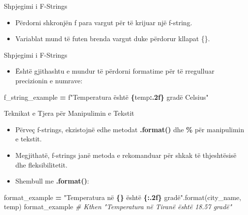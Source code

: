 \documentclass[
  ignorenonframetext,
]{beamer}
\newenvironment{Shaded}{\begin{snugshade}}{\end{snugshade}}
\newcommand{\BuiltInTok}[1]{#1}
\newcommand{\CommentTok}[1]{\textcolor[rgb]{0.56,0.35,0.01}{\textit{#1}}}
\newcommand{\NormalTok}[1]{#1}
\newcommand{\OperatorTok}[1]{\textcolor[rgb]{0.81,0.36,0.00}{\textbf{#1}}}
\newcommand{\SpecialCharTok}[1]{\textcolor[rgb]{0.81,0.36,0.00}{\textbf{#1}}}
\newcommand{\SpecialStringTok}[1]{\textcolor[rgb]{0.31,0.60,0.02}{#1}}
\newcommand{\StringTok}[1]{\textcolor[rgb]{0.31,0.60,0.02}{#1}}
\providecommand{\tightlist}{%
  \setlength{\itemsep}{0pt}\setlength{\parskip}{0pt}}
\begin{document}
\begin{frame}{Shpjegimi i F-Strings}
\protect\hypertarget{shpjegimi-i-f-strings}{}
\begin{itemize}
\item
  Përdorni shkronjën f para vargut për të krijuar një f-string.
\item
  Variablat mund të futen brenda vargut duke përdorur kllapat \{\}.
\end{itemize}
\end{frame}

\begin{frame}[fragile]{Shpjegimi i F-Strings}
\protect\hypertarget{shpjegimi-i-f-strings-1}{}
\begin{itemize}
\tightlist
\item
  Është gjithashtu e mundur të përdorni formatime për të rregulluar
  precizionin e numrave:
\end{itemize}

\begin{Shaded}
\begin{Highlighting}[]
\NormalTok{f\_string\_example }\OperatorTok{=} \SpecialStringTok{f"Temperatura është }\SpecialCharTok{\{}\NormalTok{temp}\SpecialCharTok{:.2f\}}\SpecialStringTok{ gradë Celsius"}
\end{Highlighting}
\end{Shaded}
\end{frame}

\begin{frame}[fragile]{Teknikat e Tjera për Manipulimin e Tekstit}
\protect\hypertarget{teknikat-e-tjera-puxebr-manipulimin-e-tekstit}{}
\begin{itemize}
\item
  Përveç f-strings, ekzistojnë edhe metodat \textbf{.format()} dhe
  \textbf{\%} për manipulimin e tekstit.
\item
  Megjithatë, f-strings janë metoda e rekomanduar për shkak të
  thjeshtësisë dhe fleksibilitetit.
\item
  Shembull me \textbf{.format()}:
\end{itemize}

\begin{Shaded}
\begin{Highlighting}[]
\NormalTok{format\_example }\OperatorTok{=} \StringTok{"Temperatura në }\SpecialCharTok{\{\}}\StringTok{ është }\SpecialCharTok{\{:.2f\}}\StringTok{ gradë"}\NormalTok{.}\BuiltInTok{format}\NormalTok{(city\_name, temp)}
\NormalTok{format\_example  }\CommentTok{\# Kthen "Temperatura në Tiranë është 18.57 gradë"}
\end{Highlighting}
\end{Shaded}
\end{frame}
\end{document}
